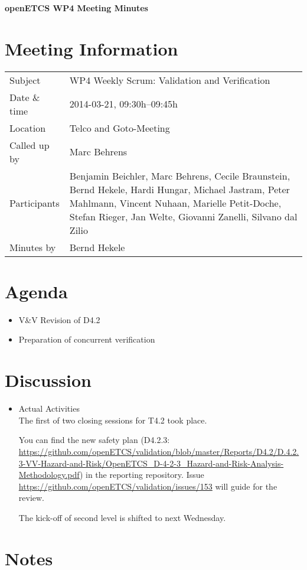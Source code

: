 \documentclass[a4paper, 11pt]{article}
\begin{document}
{\begin{center}\huge\bf openETCS WP4 Meeting Minutes\end{center}}
\section{Meeting Information}

\renewcommand{\arraystretch}{1.5}
\begin{supertabular}{m{.2\textwidth}m{.8\textwidth}}
Subject & WP4 Weekly Scrum: Validation and Verification\\
Date \& time & 2014-03-21, 09:30h--09:45h\\
Location & Telco and Goto-Meeting\\
Called up by & Marc Behrens\\
Participants &
Benjamin Beichler,
Marc Behrens,
Cecile Braunstein,
Bernd Hekele,
Hardi Hungar,
Michael Jastram,
Peter Mahlmann,
Vincent Nuhaan,
Marielle Petit-Doche,
Stefan Rieger,
Jan Welte,
Giovanni Zanelli,
Silvano dal Zilio
\\

Minutes by & Bernd Hekele\\

\end{supertabular}
\renewcommand{\arraystretch}{1.0}


\section{{Agenda}}
\begin{itemize}
\item V\&V Revision of D4.2
\item Preparation of concurrent verification
\end{itemize}

\section{Discussion}

\begin{itemize}
\item Actual Activities\\
The first of two closing sessions for T4.2 took place.

You can find the new safety plan (D4.2.3: \url{https://github.com/openETCS/validation/blob/master/Reports/D4.2/D.4.2.3-VV-Hazard-and-Risk/OpenETCS_D-4-2-3_Hazard-and-Risk-Analysis-Methodology.pdf}) in the reporting repository. Issue \url{https://github.com/openETCS/validation/issues/153} will guide for the review. 

The kick-off of second level is shifted to next Wednesday.

\end{itemize}

\section{Notes}
\end{document}
